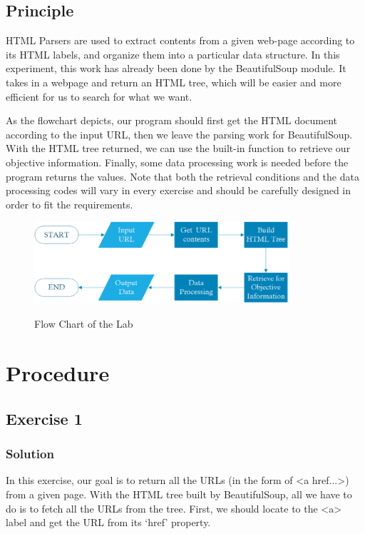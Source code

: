 \documentclass{article}
\begin{document}
\subsection{Principle}
HTML Parsers are used to extract contents from a given web-page according to its HTML labels, and organize them into a particular data structure. In this experiment, this work has already been done by the BeautifulSoup module. It takes in a webpage and return an HTML tree, which will be easier and more efficient for us to search for what we want.

As the flowchart depicts, our program should first get the HTML document according to the input URL, then we leave the parsing work for BeautifulSoup. With the HTML tree returned, we can use the built-in function to retrieve our objective information. Finally, some data processing work is needed before the program returns the values. Note that both the retrieval conditions and the data processing codes will vary in every exercise and should be carefully designed in order to fit the requirements.

\begin{figure}[htbp]
\centering
\includegraphics[width=9.5cm]{img/flowchart.png}
\label{fig:flowchart}
\caption{Flow Chart of the Lab}
\end{figure}

\section{Procedure}
\subsection{Exercise 1}

\subsubsection{Solution}
In this exercise, our goal is to return all the URLs (in the form of <a href...>) from a given page. With the HTML tree built by BeautifulSoup, all we have to do is to fetch all the URLs from the tree. First, we should locate to the <a> label and get the URL from its `href' property.
\end{document}
